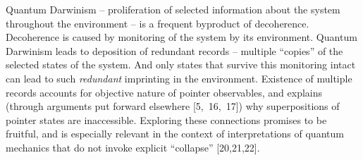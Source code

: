 \documentclass[aps,twocolumn,pra,onecolumn,12pt]{revtex4}
\newcommand{\+}         {\dagger}
\begin{document}
Quantum Darwinism -- proliferation of selected information about the system throughout 
the environment -- is a frequent byproduct of decoherence. Decoherence is caused by monitoring of 
the system by its environment. Quantum Darwinism leads to deposition of redundant records -- multiple ``copies'' of the selected states of the system. And only states that survive this monitoring intact can lead to such {\it redundant} imprinting in the environment.
Existence of multiple records accounts for objective nature of pointer observables, and explains (through arguments put forward elsewhere [5,~16,~17]) why superpositions of pointer states are inaccessible.
Exploring these connections promises to be fruitful, and is especially relevant in the context of interpretations of quantum mechanics that do not invoke explicit ``collapse'' [20,21,22]. 
\end{document}
